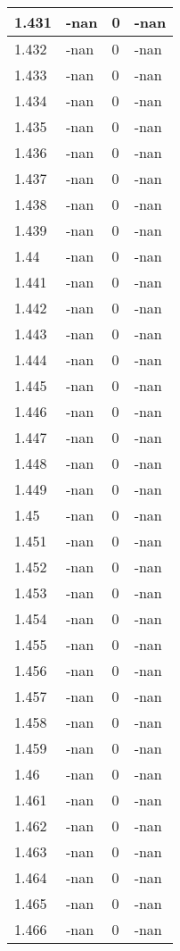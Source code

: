 \documentclass[a4paper,14pt]{extarticle}
\begin{document}
\begin{longtable}{||m{3cm}||m{3cm}|m{3cm}||m{3cm}||}
\hline
1.431 & -nan & 0 & -nan\\
\hline
1.432 & -nan & 0 & -nan\\
\hline
1.433 & -nan & 0 & -nan\\
\hline
1.434 & -nan & 0 & -nan\\
\hline
1.435 & -nan & 0 & -nan\\
\hline
1.436 & -nan & 0 & -nan\\
\hline
1.437 & -nan & 0 & -nan\\
\hline
1.438 & -nan & 0 & -nan\\
\hline
1.439 & -nan & 0 & -nan\\
\hline
1.44 & -nan & 0 & -nan\\
\hline
1.441 & -nan & 0 & -nan\\
\hline
1.442 & -nan & 0 & -nan\\
\hline
1.443 & -nan & 0 & -nan\\
\hline
1.444 & -nan & 0 & -nan\\
\hline
1.445 & -nan & 0 & -nan\\
\hline
1.446 & -nan & 0 & -nan\\
\hline
1.447 & -nan & 0 & -nan\\
\hline
1.448 & -nan & 0 & -nan\\
\hline
1.449 & -nan & 0 & -nan\\
\hline
1.45 & -nan & 0 & -nan\\
\hline
1.451 & -nan & 0 & -nan\\
\hline
1.452 & -nan & 0 & -nan\\
\hline
1.453 & -nan & 0 & -nan\\
\hline
1.454 & -nan & 0 & -nan\\
\hline
1.455 & -nan & 0 & -nan\\
\hline
1.456 & -nan & 0 & -nan\\
\hline
1.457 & -nan & 0 & -nan\\
\hline
1.458 & -nan & 0 & -nan\\
\hline
1.459 & -nan & 0 & -nan\\
\hline
1.46 & -nan & 0 & -nan\\
\hline
1.461 & -nan & 0 & -nan\\
\hline
1.462 & -nan & 0 & -nan\\
\hline
1.463 & -nan & 0 & -nan\\
\hline
1.464 & -nan & 0 & -nan\\
\hline
1.465 & -nan & 0 & -nan\\
\hline
1.466 & -nan & 0 & -nan\\

\end{longtable}
\end{document}
